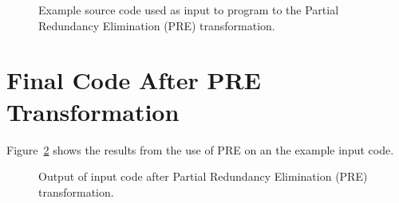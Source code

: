 \begin{figure}[!h]
{\indent
{\mySmallFontSize

\begin{latexonly}
   
\end{latexonly}

\begin{htmlonly}
   
\end{htmlonly}

}
}
\caption{Example source code used as input to program to the Partial Redundancy Elimination
    (PRE) transformation.}
\label{Tutorial:exampleInputCode_partialRedundancyElimination}
\end{figure}



\section{Final Code After PRE Transformation}

   Figure~\ref{Tutorial:exampleOutput_partialRedundancyElimination} 
shows the results from the use of PRE on an the example input code.


\begin{figure}[!h]
{\indent
{\mySmallFontSize

\begin{latexonly}
   
\end{latexonly}

\begin{htmlonly}
   
\end{htmlonly}

}
}
\caption{Output of input code after Partial Redundancy Elimination (PRE) transformation.}
\label{Tutorial:exampleOutput_partialRedundancyElimination}
\end{figure}



























